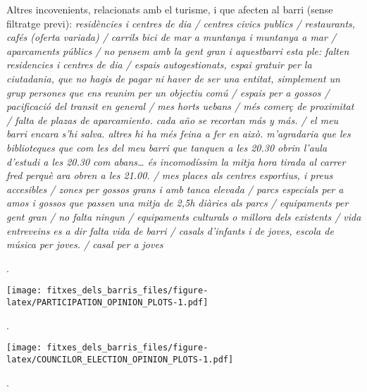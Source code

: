 \documentclass[]{article}
\begin{document}
Altres incovenients, relacionats amb el turisme, i que afecten al barri
(sense filtratge previ): \emph{residències i centres de dia / centres
civics publics / restaurants, cafés (oferta variada) / carrils bici de
mar a muntanya i muntanya a mar / aparcaments públics / no pensem amb la
gent gran i aquestbarri esta ple: falten residencies i centres de dia /
espais autogestionats, espai gratuir per la ciutadania, que no hagis de
pagar ni haver de ser una entitat, simplement un grup persones que ens
reunim per un objectiu comú / espais per a gossos / pacificació del
transit en general / mes horts uebans / més comerç de proximitat / falta
de plazas de aparcamiento. cada año se recortan más y más. / el meu
barri encara s'hi salva. altres hi ha més feina a fer en això.
m'agradaria que les biblioteques que com les del meu barri que tanquen a
les 20.30 obrin l'aula d'estudi a les 20.30 com abans\ldots{} és
incomodíssim la mitja hora tirada al carrer fred perquè ara obren a les
21.00. / mes places als centres esportius, i preus accesibles / zones
per gossos grans i amb tanca elevada / parcs especials per a amos i
gossos que passen una mitja de 2,5h diàries als parcs / equipaments per
gent gran / no falta ningun / equipaments culturals o millora dels
existents / vida entreveins es a dir falta vida de barri / casals
d'infants i de joves, escola de música per joves. / casal per a joves}

.

\texttt{[image: fitxes\_dels\_barris\_files/figure-latex/PARTICIPATION\_OPINION\_PLOTS-1.pdf]}

.

\texttt{[image: fitxes\_dels\_barris\_files/figure-latex/COUNCILOR\_ELECTION\_OPINION\_PLOTS-1.pdf]}

.
\end{document}
